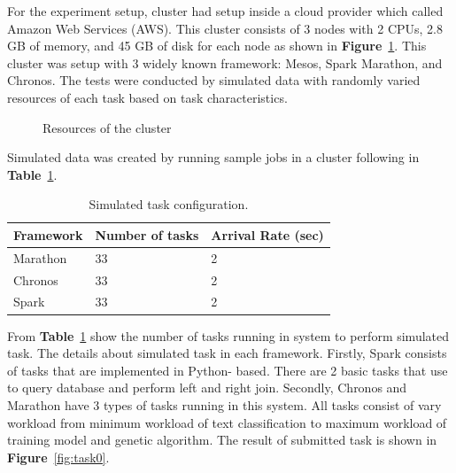 \documentclass[12pt,oneside,openright,a4paper]{cpe-english-project}
\begin{document}
\hspace{10mm}For the experiment setup, cluster had setup inside a cloud provider which called Amazon Web Services (AWS). This cluster consists of 3 nodes with 2 CPUs, 2.8 GB of memory, and 45 GB of disk for each node as shown in \textbf{Figure}~\ref{fig:resourcesCluster}. This cluster was setup with 3 widely known framework: Mesos, Spark Marathon, and Chronos. The tests were conducted by simulated data with randomly varied resources of each task based on task characteristics. 

\begin{figure}[!h]\centering
    \setlength{\fboxrule}{0mm} %
    \setlength{\fboxsep}{0cm}
    \caption{Resources of the cluster}\label{fig:resourcesCluster}
\end{figure}

Simulated data was created by running sample jobs in a cluster following in \textbf{Table}~\ref{tbl:SimulatedTaskConfiguration}.

\begin{table}[!h]
  \caption{Simulated task configuration.}\label{tbl:SimulatedTaskConfiguration}
  \begin{tabular}{@{}|p{}|p{}|p{}|}
    \hline
    \textbf{Framework} & \textbf{Number of tasks} & \textbf{Arrival Rate (sec)} \\
    \hline
    Marathon & 33 & 2 \\
    \hline
    Chronos & 33 & 2 \\ 
    \hline
    Spark & 33 & 2\\
    \hline                          
  \end{tabular}
\end{table}

\hspace{10mm}From \textbf{Table}~\ref{tbl:SimulatedTaskConfiguration} show the number of tasks running in system to perform simulated task. The details about simulated task in each framework. Firstly, Spark consists of tasks that are implemented in Python- based. There are 2 basic tasks that use to query database and perform left and right join. Secondly, Chronos and Marathon have 3 types of tasks running in this system. All tasks consist of vary workload from minimum workload of text classification to maximum workload of training model and genetic algorithm. The result of submitted task is shown in \textbf{Figure}~\ref{fig:task0}.
\end{document}
